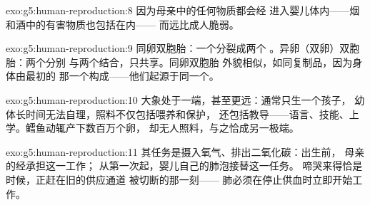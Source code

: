 \begin{solution}{exo:g5:human-reproduction:8}
因为母亲中的任何物质都会经
进入婴儿体内——烟和酒中的有害物质也包括在内——
而远比成人脆弱。
\end{solution}

\begin{solution}{exo:g5:human-reproduction:9}
同卵双胞胎：一个分裂成两个
。异卵（双卵）双胞胎：两个分别
与两个结合，只共享。同卵双胞胎
外貌相似，如同复制品，因为身体由最初的
那一个构成——他们起源于同一个。
\end{solution}

\begin{solution}{exo:g5:human-reproduction:10}
大象处于一端，甚至更远：通常只生一个孩子，
幼体长时间无法自理，照料不仅包括喂养和保护，
还包括教导——语言、技能、上学。鳕鱼动辄产下数百万个卵，
却无人照料，与之恰成另一极端。
\end{solution}

\begin{solution}{exo:g5:human-reproduction:11}
其任务是摄入氧气、排出二氧化碳：出生前，
母亲的经承担这一工作；
从第一次起，婴儿自己的肺泡接替这一任务。
啼哭来得恰是时候，正赶在旧的供应通道
被切断的那一刻——
肺必须在停止供血时立即开始工作。
\end{solution}
